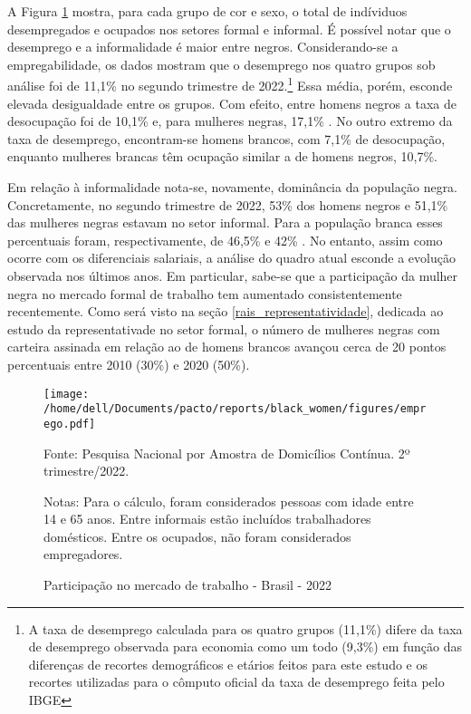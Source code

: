 \documentclass[12pt]{article}
\begin{document}
\par A Figura \ref{fig:employment} mostra, para cada grupo de cor e sexo, o total de indíviduos desempregados e ocupados nos setores formal e informal. É possível notar que o desemprego e a informalidade é maior entre negros. Considerando-se a empregabilidade, os dados mostram que o desemprego nos quatro grupos sob análise foi de 11,1\% no segundo trimestre de 2022.\footnote{A taxa de desemprego calculada para os quatro grupos (11,1\%) difere da taxa de desemprego observada para economia como um todo (9,3\%) em função das diferenças de recortes demográficos e etários feitos para este estudo e os recortes utilizadas para o cômputo oficial da taxa de desemprego feita pelo IBGE} Essa média, porém, esconde elevada desigualdade entre os grupos. Com efeito, entre homens negros a taxa de desocupação foi de 10,1\% e, para mulheres negras, 17,1\% . No outro extremo da taxa de desemprego, encontram-se homens brancos, com 7,1\% de desocupação, enquanto mulheres brancas têm ocupação similar a de homens negros, 10,7\%.

\par Em relação à informalidade nota-se, novamente, dominância da população negra. Concretamente, no segundo trimestre de 2022, 53\% dos homens negros e 51,1\% das mulheres negras estavam no setor informal. Para a população branca esses percentuais foram, respectivamente, de 46,5\%  e 42\% . No entanto, assim como ocorre com os diferenciais salariais, a análise do quadro atual esconde a evolução observada nos últimos anos. Em particular, sabe-se que a participação da mulher negra no mercado formal de trabalho tem aumentado consistentemente recentemente. Como será visto na seção \ref{rais_representatividade}, dedicada ao estudo da representativade no setor formal, o número de mulheres negras com carteira assinada em relação ao de homens brancos avançou cerca de 20 pontos percentuais entre 2010 (30\%) e 2020 (50\%).

\begin{figure}[H]
    \centering
    \caption{Participação no mercado de trabalho - Brasil - 2022}
        \texttt{[image: /home/dell/Documents/pacto/reports/black\_women/figures/emprego.pdf]}
    \label{fig:employment}
    \begin{floatnotes}
        \item[Fonte:] Pesquisa Nacional por Amostra de Domicílios Contínua. 2º trimestre/2022.
        \item[Notas:] Para o cálculo, foram considerados pessoas com idade entre 14 e 65 anos. Entre informais estão incluídos trabalhadores domésticos. Entre os ocupados, não foram considerados empregadores.
    \end{floatnotes}
\end{figure}
\end{document}
